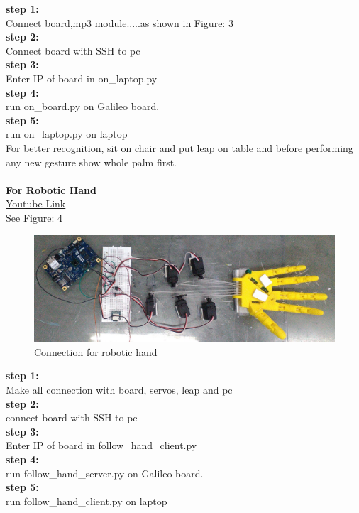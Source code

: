 \documentclass[a4paper,12pt,oneside]{book}
\begin{document}
\textbf{step 1:}\\
Connect board,mp3 module.....as shown in Figure: 3\\
\textbf{step 2:}\\
Connect board with SSH to pc\\
\textbf{step 3:}\\
Enter IP of board in on\_laptop.py\\
\textbf{step 4:}\\
run on\_board.py on Galileo board.\\
\textbf{step 5:}\\
run on\_laptop.py on laptop\\


For better recognition, sit on chair and put leap on table and before performing any new gesture show whole palm first.\\
\vspace{1cm}\\
\textbf{For Robotic Hand}\\
\href{https://youtu.be/TIkOeNoe4vE}{Youtube Link}\\
See Figure: 4\\

\begin{figure}
  \includegraphics[width=\linewidth]{4.jpg}
  \caption{Connection for robotic hand}
\end{figure}
\textbf{step 1:}\\
Make all connection with board, servos, leap and pc\\
\textbf{step 2:}\\
connect board with SSH to pc\\
\textbf{step 3:}\\
Enter IP of board in follow\_hand\_client.py\\
\textbf{step 4:}\\
run follow\_hand\_server.py on Galileo board.\\
\textbf{step 5:}\\
run follow\_hand\_client.py on laptop\\
\end{document}

